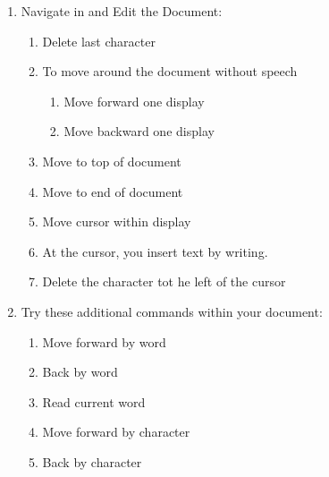 \documentclass[10pt,letterpaper,twoside]{report}
\begin{document}
\begin{enumerate}
\begin{enumerate}
	      \end{enumerate}
	\item Navigate in and Edit the Document:
	      \begin{enumerate}
		      \item Delete last character 
		      \item To move around the document without speech 
		            \begin{enumerate}
			            \item Move forward one display 
			            \item Move backward one display 
		            \end{enumerate}
		      \item Move to top of document 
		      \item Move to end of document 
		      \item Move cursor within display 
		      \item At the cursor, you insert text by writing.
		      \item Delete the character tot he left of the cursor 
	      \end{enumerate}
	\item Try these additional commands within your document:
	      \begin{enumerate}
		      \item Move forward by word 
		      \item Back by word 
		      \item Read current word 
		      \item Move forward by character 
		      \item Back by character 

\end{enumerate}
\end{enumerate}
\end{document}
